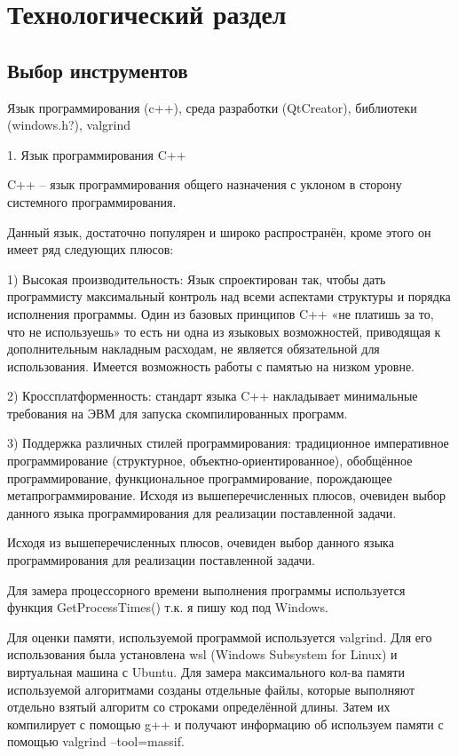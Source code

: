 \chapter{Технологический раздел}
\section{Выбор инструментов}
Язык программирования (c++), среда разработки (QtCreator), библиотеки (windows.h?), valgrind

1.	Язык программирования C++

C++ – язык программирования общего назначения с уклоном в сторону системного программирования. \cite{c++}

Данный язык, достаточно популярен и широко распространён, кроме этого он имеет ряд следующих плюсов:

1)	Высокая производительность: Язык спроектирован так, чтобы дать программисту максимальный контроль над всеми аспектами структуры и порядка исполнения программы. Один из базовых принципов C++ «не платишь за то, что не используешь» то есть ни одна из языковых возможностей, приводящая к дополнительным накладным расходам, не является обязательной для использования. Имеется возможность работы с памятью на низком уровне. 

2)	Кроссплатформенность: стандарт языка C++ накладывает минимальные требования на ЭВМ для запуска скомпилированных программ.

3)	Поддержка различных стилей программирования: традиционное императивное программирование (структурное, объектно-ориентированное), обобщённое программирование, функциональное программирование, порождающее метапрограммирование.
Исходя из вышеперечисленных плюсов, очевиден выбор данного языка программирования для реализации поставленной задачи.

Исходя из вышеперечисленных плюсов, очевиден выбор данного языка программирования для реализации поставленной задачи.

Для замера процессорного времени выполнения программы используется функция GetProcessTimes() т.к. я пишу код под Windows. \cite{get_proccess_times} 

Для оценки памяти, используемой программой используется valgrind. Для его использования была установлена wsl (Windows Subsystem for Linux) и виртуальная машина с Ubuntu. Для замера максимального кол-ва памяти используемой алгоритмами созданы отдельные файлы, которые выполняют отдельно взятый алгоритм со строками определённой длины. Затем их компилирует с помощью g++ и получают информацию об используем памяти с помощью valgrind --tool=massif. \cite{get_memory}

